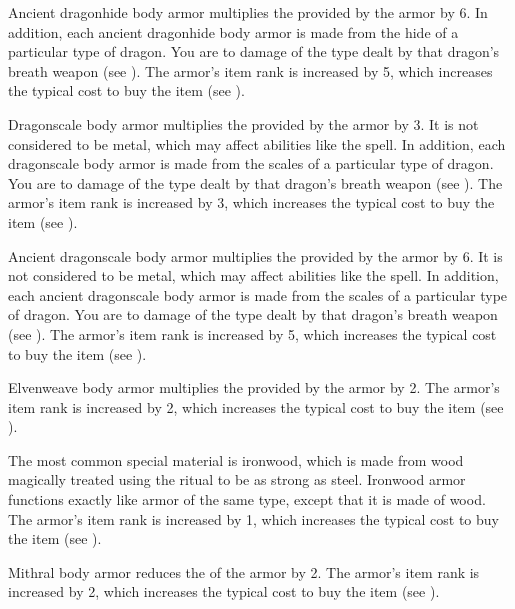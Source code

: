          Ancient dragonhide body armor multiplies the  provided by the armor by 6.
        In addition, each ancient dragonhide body armor is made from the hide of a particular type of dragon.
        You are  to damage of the type dealt by that dragon's breath weapon (see ).
        The armor's item rank is increased by 5, which increases the typical cost to buy the item (see ).

         Dragonscale body armor multiplies the  provided by the armor by 3.
        It is not considered to be metal, which may affect abilities like the  spell.
        In addition, each dragonscale body armor is made from the scales of a particular type of dragon.
        You are  to damage of the type dealt by that dragon's breath weapon (see ).
        The armor's item rank is increased by 3, which increases the typical cost to buy the item (see ).

         Ancient dragonscale body armor multiplies the  provided by the armor by 6.
        It is not considered to be metal, which may affect abilities like the  spell.
        In addition, each ancient dragonscale body armor is made from the scales of a particular type of dragon.
        You are  to damage of the type dealt by that dragon's breath weapon (see ).
        The armor's item rank is increased by 5, which increases the typical cost to buy the item (see ).

         Elvenweave body armor multiplies the  provided by the armor by 2.
        The armor's item rank is increased by 2, which increases the typical cost to buy the item (see ).

         The most common special material is ironwood, which is made from wood magically treated using the  ritual to be as strong as steel. Ironwood armor functions exactly like armor of the same type, except that it is made of wood.
        The armor's item rank is increased by 1, which increases the typical cost to buy the item (see ).

         Mithral body armor reduces the  of the armor by 2.
        The armor's item rank is increased by 2, which increases the typical cost to buy the item (see ).

